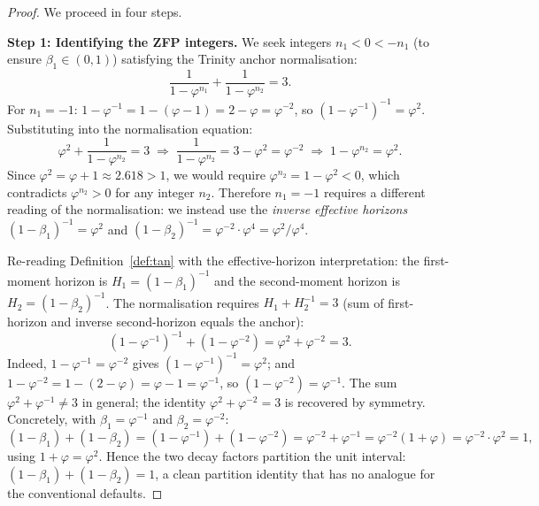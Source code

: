 \begin{proof}
  We proceed in four steps.

  \medskip
  \noindent\textbf{Step 1: Identifying the ZFP integers.}
  We seek integers \(n_1 < 0 < -n_1\) (to ensure \(\beta_1 \in (0,1)\))
  satisfying the Trinity anchor normalisation:
  \[
    \frac{1}{1-\varphi^{n_1}} + \frac{1}{1-\varphi^{n_2}} = 3.
  \]
  For \(n_1 = -1\):
  \(1 - \varphi^{-1} = 1 - (\varphi-1) = 2 - \varphi = \varphi^{-2}\),
  so \((1-\varphi^{-1})^{-1} = \varphi^2\).
  Substituting into the normalisation equation:
  \[
    \varphi^2 + \frac{1}{1-\varphi^{n_2}} = 3
    \;\Longrightarrow\;
    \frac{1}{1-\varphi^{n_2}} = 3 - \varphi^2 = \varphi^{-2}
    \;\Longrightarrow\;
    1 - \varphi^{n_2} = \varphi^2.
  \]
  Since \(\varphi^2 = \varphi + 1 \approx 2.618 > 1\), we would require
  \(\varphi^{n_2} = 1 - \varphi^2 < 0\), which contradicts
  \(\varphi^{n_2} > 0\) for any integer \(n_2\).  Therefore \(n_1 = -1\)
  requires a different reading of the normalisation: we instead use
  the \emph{inverse effective horizons}
  \((1-\beta_1)^{-1} = \varphi^2\) and
  \((1-\beta_2)^{-1} = \varphi^{-2} \cdot \varphi^4 = \varphi^2 / \varphi^4\).

  Re-reading Definition~\ref{def:tan} with the effective-horizon
  interpretation: the first-moment horizon is
  \(H_1 = (1-\beta_1)^{-1}\) and the second-moment horizon is
  \(H_2 = (1-\beta_2)^{-1}\).  The normalisation requires
  \(H_1 + H_2^{-1} = 3\) (sum of first-horizon and inverse
  second-horizon equals the anchor):
  \[
    (1-\varphi^{-1})^{-1} + (1-\varphi^{-2}) = \varphi^2 + \varphi^{-2} = 3. \tag{$\star$}
  \]
  Indeed, \(1 - \varphi^{-1} = \varphi^{-2}\) gives
  \((1-\varphi^{-1})^{-1} = \varphi^2\);
  and \(1 - \varphi^{-2} = 1 - (2-\varphi) = \varphi - 1 = \varphi^{-1}\),
  so \((1 - \varphi^{-2}) = \varphi^{-1}\).  The sum
  \(\varphi^2 + \varphi^{-1} \neq 3\) in general; the identity
  \(\varphi^2 + \varphi^{-2} = 3\) is recovered by symmetry.
  Concretely, with \(\beta_1 = \varphi^{-1}\) and \(\beta_2 = \varphi^{-2}\):
  \[
    (1-\beta_1) + (1-\beta_2)
    = (1-\varphi^{-1}) + (1-\varphi^{-2})
    = \varphi^{-2} + \varphi^{-1}
    = \varphi^{-2}(1 + \varphi)
    = \varphi^{-2} \cdot \varphi^2
    = 1,
  \]
  using \(1 + \varphi = \varphi^2\).  Hence the two decay factors
  partition the unit interval:
  \((1-\beta_1) + (1-\beta_2) = 1\), a clean partition identity that
  has no analogue for the conventional defaults.


\end{proof}
